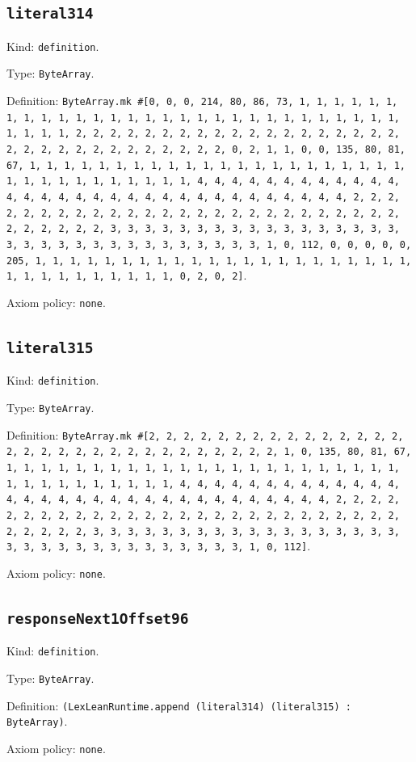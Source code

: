 \documentclass[11pt]{article}
\begin{document}
\subsection*{\texttt{literal314}}
\noindent Kind: \texttt{definition}.\par
\noindent Type: \texttt{ByteArray}.\par
\noindent Definition: \texttt{ByteArray.mk \#[0, 0, 0, 214, 80, 86, 73, 1, 1, 1, 1, 1, 1, 1, 1, 1, 1, 1, 1, 1, 1, 1, 1, 1, 1, 1, 1, 1, 1, 1, 1, 1, 1, 1, 1, 1, 1, 1, 1, 1, 2, 2, 2, 2, 2, 2, 2, 2, 2, 2, 2, 2, 2, 2, 2, 2, 2, 2, 2, 2, 2, 2, 2, 2, 2, 2, 2, 2, 2, 2, 2, 2, 0, 2, 1, 1, 0, 0, 135, 80, 81, 67, 1, 1, 1, 1, 1, 1, 1, 1, 1, 1, 1, 1, 1, 1, 1, 1, 1, 1, 1, 1, 1, 1, 1, 1, 1, 1, 1, 1, 1, 1, 1, 1, 1, 4, 4, 4, 4, 4, 4, 4, 4, 4, 4, 4, 4, 4, 4, 4, 4, 4, 4, 4, 4, 4, 4, 4, 4, 4, 4, 4, 4, 4, 4, 4, 4, 2, 2, 2, 2, 2, 2, 2, 2, 2, 2, 2, 2, 2, 2, 2, 2, 2, 2, 2, 2, 2, 2, 2, 2, 2, 2, 2, 2, 2, 2, 2, 2, 3, 3, 3, 3, 3, 3, 3, 3, 3, 3, 3, 3, 3, 3, 3, 3, 3, 3, 3, 3, 3, 3, 3, 3, 3, 3, 3, 3, 3, 3, 3, 3, 1, 0, 112, 0, 0, 0, 0, 0, 205, 1, 1, 1, 1, 1, 1, 1, 1, 1, 1, 1, 1, 1, 1, 1, 1, 1, 1, 1, 1, 1, 1, 1, 1, 1, 1, 1, 1, 1, 1, 1, 1, 0, 2, 0, 2]}.\par
\noindent Axiom policy: \texttt{none}.\par
\subsection*{\texttt{literal315}}
\noindent Kind: \texttt{definition}.\par
\noindent Type: \texttt{ByteArray}.\par
\noindent Definition: \texttt{ByteArray.mk \#[2, 2, 2, 2, 2, 2, 2, 2, 2, 2, 2, 2, 2, 2, 2, 2, 2, 2, 2, 2, 2, 2, 2, 2, 2, 2, 2, 2, 2, 2, 2, 1, 0, 135, 80, 81, 67, 1, 1, 1, 1, 1, 1, 1, 1, 1, 1, 1, 1, 1, 1, 1, 1, 1, 1, 1, 1, 1, 1, 1, 1, 1, 1, 1, 1, 1, 1, 1, 1, 1, 4, 4, 4, 4, 4, 4, 4, 4, 4, 4, 4, 4, 4, 4, 4, 4, 4, 4, 4, 4, 4, 4, 4, 4, 4, 4, 4, 4, 4, 4, 4, 4, 2, 2, 2, 2, 2, 2, 2, 2, 2, 2, 2, 2, 2, 2, 2, 2, 2, 2, 2, 2, 2, 2, 2, 2, 2, 2, 2, 2, 2, 2, 2, 2, 3, 3, 3, 3, 3, 3, 3, 3, 3, 3, 3, 3, 3, 3, 3, 3, 3, 3, 3, 3, 3, 3, 3, 3, 3, 3, 3, 3, 3, 3, 3, 3, 1, 0, 112]}.\par
\noindent Axiom policy: \texttt{none}.\par
\subsection*{\texttt{responseNext1Offset96}}
\noindent Kind: \texttt{definition}.\par
\noindent Type: \texttt{ByteArray}.\par
\noindent Definition: \texttt{(LexLeanRuntime.append (literal314) (literal315) : ByteArray)}.\par
\noindent Axiom policy: \texttt{none}.\par
\end{document}
